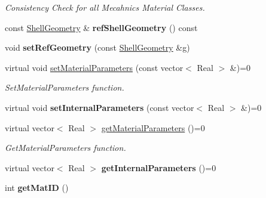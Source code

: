 \begin{DoxyCompactItemize}
\begin{DoxyCompactList}\small\item\em Consistency Check for all Mecahnics Material Classes. \item\end{DoxyCompactList}\item 
\hypertarget{classvoom_1_1_shell_material_af3ddecfe46aefcc9b42b80856cfc26ce}{
const \hyperlink{classvoom_1_1_shell_geometry}{ShellGeometry} \& {\bfseries refShellGeometry} () const }
\label{classvoom_1_1_shell_material_af3ddecfe46aefcc9b42b80856cfc26ce}

\item 
\hypertarget{classvoom_1_1_shell_material_a39401e2f72df52fb2fbf6598154054ab}{
void {\bfseries setRefGeometry} (const \hyperlink{classvoom_1_1_shell_geometry}{ShellGeometry} \&g)}
\label{classvoom_1_1_shell_material_a39401e2f72df52fb2fbf6598154054ab}

\item 
\hypertarget{classvoom_1_1_shell_material_afd9c6cabba309bf6cedd8836b14e97eb}{
virtual void \hyperlink{classvoom_1_1_shell_material_afd9c6cabba309bf6cedd8836b14e97eb}{setMaterialParameters} (const vector$<$ Real $>$ \&)=0}
\label{classvoom_1_1_shell_material_afd9c6cabba309bf6cedd8836b14e97eb}

\begin{DoxyCompactList}\small\item\em SetMaterialParameters function. \item\end{DoxyCompactList}\item 
\hypertarget{classvoom_1_1_shell_material_a7b182bdd7d4c4887fe343fc822b66713}{
virtual void {\bfseries setInternalParameters} (const vector$<$ Real $>$ \&)=0}
\label{classvoom_1_1_shell_material_a7b182bdd7d4c4887fe343fc822b66713}

\item 
\hypertarget{classvoom_1_1_shell_material_a799dd9ad6108e9f38c07ace296862e92}{
virtual vector$<$ Real $>$ \hyperlink{classvoom_1_1_shell_material_a799dd9ad6108e9f38c07ace296862e92}{getMaterialParameters} ()=0}
\label{classvoom_1_1_shell_material_a799dd9ad6108e9f38c07ace296862e92}

\begin{DoxyCompactList}\small\item\em GetMaterialParameters function. \item\end{DoxyCompactList}\item 
\hypertarget{classvoom_1_1_shell_material_a23d814ccdd4fc5cec3545c5b0a083042}{
virtual vector$<$ Real $>$ {\bfseries getInternalParameters} ()=0}
\label{classvoom_1_1_shell_material_a23d814ccdd4fc5cec3545c5b0a083042}

\item 
\hypertarget{classvoom_1_1_shell_material_a87e6168c30107db09aef38c3839ffaca}{
int {\bfseries getMatID} ()}
\label{classvoom_1_1_shell_material_a87e6168c30107db09aef38c3839ffaca}

\end{DoxyCompactItemize}
